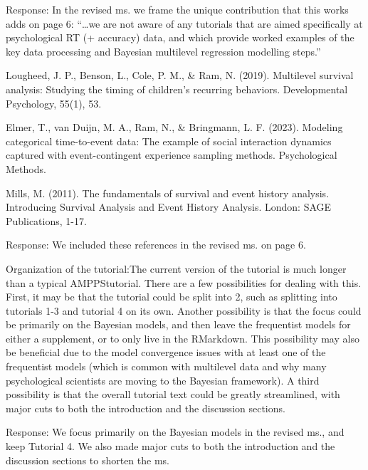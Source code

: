 \documentclass[
]{article}
\renewenvironment{quote}{\begin{leftbar}}{\end{leftbar}}
\begin{document}
Response: In the revised ms. we frame the unique contribution that this
works adds on page 6: ``\ldots we are not aware of any tutorials that
are aimed specifically at psychological RT (+ accuracy) data, and which
provide worked examples of the key data processing and Bayesian
multilevel regression modelling steps.''

\begin{quote}
Lougheed, J. P., Benson, L., Cole, P. M., \& Ram, N. (2019). Multilevel
survival analysis: Studying the timing of children's recurring
behaviors. Developmental Psychology, 55(1), 53.
\end{quote}

\begin{quote}
Elmer, T., van Duijn, M. A., Ram, N., \& Bringmann, L. F. (2023).
Modeling categorical time-to-event data: The example of social
interaction dynamics captured with event-contingent experience sampling
methods. Psychological Methods.
\end{quote}

\begin{quote}
Mills, M. (2011). The fundamentals of survival and event history
analysis. Introducing Survival Analysis and Event History Analysis.
London: SAGE Publications, 1-17.
\end{quote}

Response: We included these references in the revised ms. on page 6.

\begin{quote}
Organization of the tutorial:The current version of the tutorial is much
longer than a typical AMPPStutorial. There are a few possibilities for
dealing with this. First, it may be that the tutorial could be split
into 2, such as splitting into tutorials 1-3 and tutorial 4 on its own.
Another possibility is that the focus could be primarily on the Bayesian
models, and then leave the frequentist models for either a supplement,
or to only live in the RMarkdown. This possibility may also be
beneficial due to the model convergence issues with at least one of the
frequentist models (which is common with multilevel data and why many
psychological scientists are moving to the Bayesian framework). A third
possibility is that the overall tutorial text could be greatly
streamlined, with major cuts to both the introduction and the discussion
sections.
\end{quote}

Response: We focus primarily on the Bayesian models in the revised ms.,
and keep Tutorial 4. We also made major cuts to both the introduction
and the discussion sections to shorten the ms.
\end{document}
